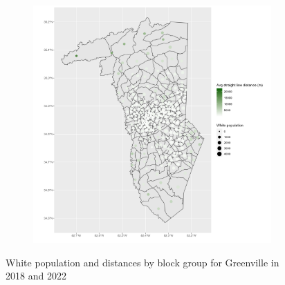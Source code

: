 \documentclass[11pt]{article}
\theoremstyle{remark}
\theoremstyle{definition}
\begin{document}
\begin{figure}
\begin{subfigure}{.5\textwidth}
		\includegraphics[width=\linewidth]{result analysis/Greenville_SC_original_configs/white_pop_and_dist_Greenville_config_original_2022_polls.png}
		\label{sfig:Greenville_2022_bg_dist}
	\end{subfigure}
	\caption{White population and distances by block group for Greenville in 2018 and 2022}
	\label{fig:Greenville distance White population maps}
\end{figure}
\end{document}
